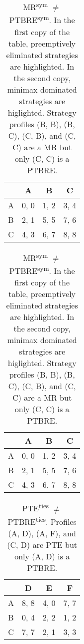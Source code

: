 \begin{table}
	\caption{
		MR\textsuperscript{sym} $\ne$ PTBRE\textsuperscript{sym}.
		In the first copy of the table, preemptively eliminated strategies are highlighted.
		In the second copy, minimax dominated strategies are higlighted.
		Strategy profiles (B, B), (B, C), (C, B), and (C, C) are a MR but only (C, C) is a PTBRE.
	}
	\label{tab:sym-mr-ne-ptbre}
	\centering
	\begin{tabular}{|c|c|c|c|}
		\hline
			& A		& B	   & C	  \\
		\hline
		A 		&\cellcolor{gray!80} 0, 0 &\cellcolor{gray!80} 1, 2 &\cellcolor{gray!80} 3, 4 \\
		\hline
		B		&\cellcolor{gray!80} 2, 1 &\cellcolor{gray!50} 5, 5 &\cellcolor{gray!20} 7, 6 \\
		\hline
		C		&\cellcolor{gray!80} 4, 3 &\cellcolor{gray!20} 6, 7 &\cellcolor{gray!00} 8, 8 \\
		\hline
	\end{tabular}
	\hspace{1em}
	\begin{tabular}{|c|c|c|c|}
		\hline
			& A		& B	   & C	  \\
		\hline
		A 		&\cellcolor{gray!80} 0, 0 &\cellcolor{gray!80} 1, 2 &\cellcolor{gray!80} 3, 4 \\
		\hline
		B		&\cellcolor{gray!80} 2, 1 &\cellcolor{gray!00} 5, 5 &\cellcolor{gray!00} 7, 6 \\
		\hline
		C		&\cellcolor{gray!80} 4, 3 &\cellcolor{gray!00} 6, 7 &\cellcolor{gray!00} 8, 8 \\
		\hline
	\end{tabular}
\end{table}


\begin{table}
	\caption{
		PTE\textsuperscript{ties} $\ne$ PTBRE\textsuperscript{ties}.
		Profiles (A, D), (A, F), and (C, D) are PTE but only (A, D) is a PTBRE.
	}
	\label{tab:ties-pte-ne-ptbre}
	\centering
	\begin{tabular}{|c|c|c|c|}
		\hline
			& D		& E	   & F	  \\
		\hline
		A 		&\cellcolor{gray!00} 8, 8 &\cellcolor{gray!70} 4, 0 &\cellcolor{gray!00} 7, 7 \\
		\hline
		B		&\cellcolor{gray!70} 0, 4 &\cellcolor{gray!70} 2, 2 &\cellcolor{gray!70} 1, 2 \\
		\hline
		C		&\cellcolor{gray!00} 7, 7 &\cellcolor{gray!70} 2, 1 &\cellcolor{gray!70} 3, 3 \\
		\hline
	\end{tabular}
\end{table}
